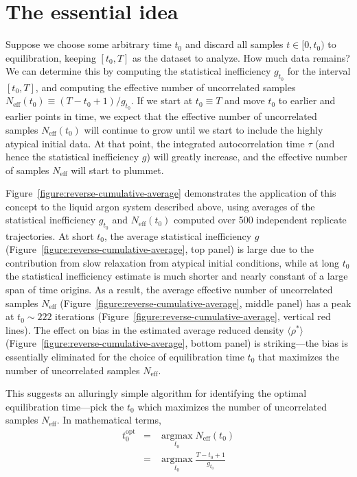\documentclass[aps,pre,twocolumn,nofootinbib,superscriptaddress,linenumbers,11point]{revtex4-1}
\newcommand{\expect}[1]{\langle #1 \rangle}                %
\DeclareMathOperator*{\argmax}{argmax}
\newcommand*{\argmaxl}{\argmax\limits}
\begin{document}
\section*{The essential idea}
\label{section:the-idea}

Suppose we choose some arbitrary time $t_0$ and discard all samples $t \in [0, t_0)$ to equilibration, keeping $[t_0, T]$ as the dataset to analyze.
How much data remains?
We can determine this by computing the statistical inefficiency $g_{t_0}$ for the interval $[t_0, T]$, and computing the effective number of uncorrelated samples $N_\mathrm{eff}(t_0) \equiv (T - t_0 + 1) / g_{t_0}$.
If we start at $t_0 \equiv T$ and move $t_0$ to earlier and earlier points in time, we expect that the effective number of uncorrelated samples $N_\mathrm{eff}(t_0)$ will continue to grow until we start to include the highly atypical initial data.
At that point, the integrated autocorrelation time $\tau$ (and hence the statistical inefficiency $g$) will greatly increase, and the effective number of samples $N_\mathrm{eff}$ will start to plummet.

Figure~\ref{figure:reverse-cumulative-average} demonstrates the application of this concept to the liquid argon system described above, using averages of the statistical inefficiency $g_{t_0}$ and $N_\mathrm{eff}(t_0)$ computed over 500 independent replicate trajectories.
At short $t_0$, the average statistical inefficiency $g$ (Figure~\ref{figure:reverse-cumulative-average}, top panel) is large due to the contribution from slow relaxation from atypical initial conditions, while at long $t_0$ the statistical inefficiency estimate is much shorter and nearly constant of a large span of time origins.
As a result, the average effective number of uncorrelated samples $N_\mathrm{eff}$ (Figure~\ref{figure:reverse-cumulative-average}, middle panel) has a peak at $t_0 \sim 222$ iterations (Figure~\ref{figure:reverse-cumulative-average}, vertical red lines).
The effect on bias in the estimated average reduced density $\expect{\rho^*}$ (Figure~\ref{figure:reverse-cumulative-average}, bottom panel) is striking---the bias is essentially eliminated for the choice of equilibration time $t_0$ that maximizes the number of uncorrelated samples $N_\mathrm{eff}$.

This suggests an alluringly simple algorithm for identifying the optimal equilibration time---pick the $t_0$ which maximizes the number of uncorrelated samples $N_\mathrm{eff}$.
In mathematical terms, 
\begin{eqnarray}
t_0^\mathrm{opt} &=& \argmaxl_{t_0} N_\mathrm{eff}(t_0) \label{equation:optimal-equilibration-time} \\
&=& \argmaxl_{t_0}  \frac{T - t_0 + 1}{g_{t_0}}
\end{eqnarray}
\end{document}
